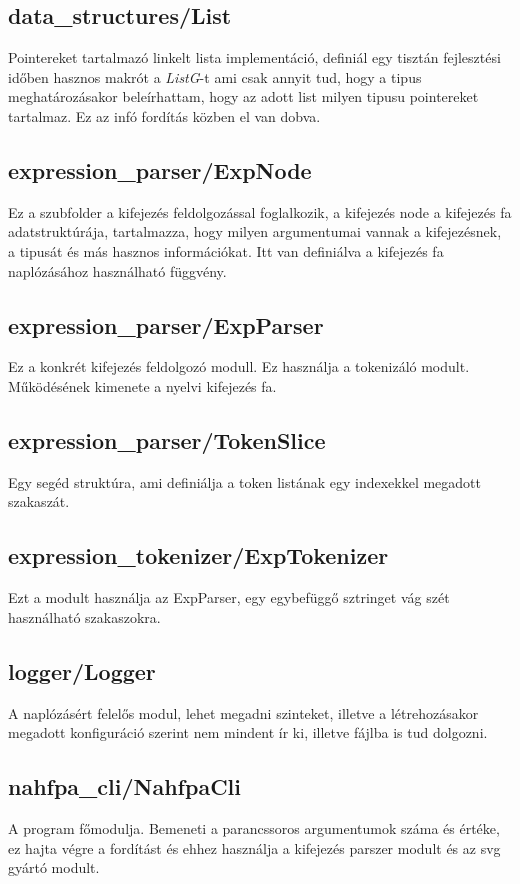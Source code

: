 \documentclass{article}[12pt,a4paper]
\newcommand{\lang}[1]{\textit{#1}}
\begin{document}
    \subsection{data\_structures/List}
    Pointereket tartalmazó linkelt lista implementáció, definiál egy tisztán fejlesztési időben hasznos makrót a \lang{ListG}-t ami csak annyit tud, hogy a tipus meghatározásakor beleírhattam, hogy az adott list milyen tipusu pointereket tartalmaz.
    Ez az infó fordítás közben el van dobva.

    \subsection{expression\_parser/ExpNode}
    Ez a szubfolder a kifejezés feldolgozással foglalkozik, a kifejezés node a kifejezés fa adatstruktúrája, tartalmazza, hogy milyen argumentumai vannak a kifejezésnek, a tipusát és más hasznos információkat.
    Itt van definiálva a kifejezés fa naplózásához használható függvény.

    \subsection{expression\_parser/ExpParser}
    Ez a konkrét kifejezés feldolgozó modull.
    Ez használja a tokenizáló modult.
    Működésének kimenete a nyelvi kifejezés fa.
    
    \subsection{expression\_parser/TokenSlice}
    Egy segéd struktúra, ami definiálja a token listának egy indexekkel megadott szakaszát.
    
    \subsection{expression\_tokenizer/ExpTokenizer}
    Ezt a modult használja az ExpParser, egy egybefüggő sztringet vág szét használható szakaszokra.

    \subsection{logger/Logger}
    A naplózásért felelős modul, lehet megadni szinteket, illetve a létrehozásakor megadott konfiguráció szerint nem mindent ír ki, illetve fájlba is tud dolgozni.

    \subsection{nahfpa\_cli/NahfpaCli}
    A program főmodulja.
    Bemeneti a parancssoros argumentumok száma és értéke, ez hajta végre a fordítást és ehhez használja a kifejezés parszer modult és az svg gyártó modult.
\end{document}
